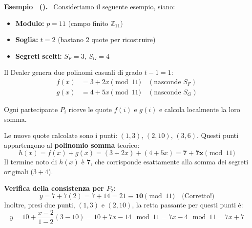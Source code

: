 \documentclass[a4paper, 11pt]{article}
\newenvironment{example}[1][]{
  \par\noindent\textbf{Esempio%
  \if\relax\detokenize{#1}\relax\else\ (\textbf{#1})\fi.}\ }{}
\begin{document}
\begin{example}
    Consideriamo il seguente esempio, siano:
    \begin{itemize}
        \item \textbf{Modulo:} $p = 11$ (campo finito $\mathbb{Z}_{11}$)
        \item \textbf{Soglia:} $t = 2$ (bastano 2 quote per ricostruire)
        \item \textbf{Segreti scelti:} $S_F = 3$, $S_G = 4$
    \end{itemize}

    Il Dealer genera due polinomi casuali di grado $t-1 = 1$:
    \begin{align*}
        f(x) &= 3 + 2x \pmod{11} \quad (\text{nasconde } S_F) \\
        g(x) &= 4 + 5x \pmod{11} \quad (\text{nasconde } S_G)
    \end{align*}

    Ogni partecipante $P_i$ riceve le quote $f(i)$ e $g(i)$ e calcola localmente la loro somma.

    \begin{table}[h!]
    \centering
    \caption{Calcolo delle quote aggregate}
    \end{table}

    Le nuove quote calcolate sono i punti: $(1, 3)$, $(2, 10)$, $(3, 6)$.
    Questi punti appartengono al \textbf{polinomio somma} teorico:
    \[
    h(x) = f(x) + g(x) = (3+2x) + (4+5x) = \mathbf{7 + 7x} \pmod{11}
    \]
    Il termine noto di $h(x)$ è \textbf{7}, che corrisponde esattamente alla somma dei segreti originali ($3+4$).

    \textbf{Verifica della consistenza per $P_2$:}
    \[
    y = 7 + 7(2) = 7 + 14 = 21 \equiv \mathbf{10} \pmod{11} \quad \text{(Corretto!)}
    \]
    Inoltre, presi due punti, $(1, 3)$ e $(2, 10)$, la retta passante per questi punti è:
    \[
        y = 10 + \frac{x - 2}{1 - 2}(3 - 10) = 10 + 7x - 14 \mod 11 = 7x - 4 \mod 11 = 7x + 7  
    \]
\end{example}
\end{document}
